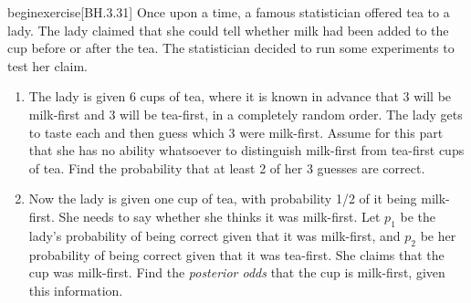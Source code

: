 
\setcounter{theorem}{14}
begin{exercise}[BH.3.31]
  Once upon a time, a famous statistician offered tea to a lady. The lady claimed that she could tell whether milk had been added to the cup before or after the tea. The statistician decided to run some experiments to test her claim.
	\begin{enumerate}
		\item The lady is given 6 cups of tea, where it is known in advance that 3 will be milk-first and 3 will be tea-first, in a completely random order. The lady gets to taste each and then guess which 3 were milk-first. Assume for this part that she has no ability whatsoever to distinguish milk-first from tea-first cups of tea. Find the probability that at least 2 of her 3 guesses are correct.
		\item Now the lady is given one cup of tea, with probability 1/2 of it being milk-first. She needs to say whether she thinks it was milk-first. Let $p_1$ be the lady's probability of being correct given that it was milk-first, and $p_2$ be her probability of being correct given that it was tea-first. She claims that the cup was milk-first. Find the \emph{posterior odds} that the cup is milk-first, given this information.
	\end{enumerate}
